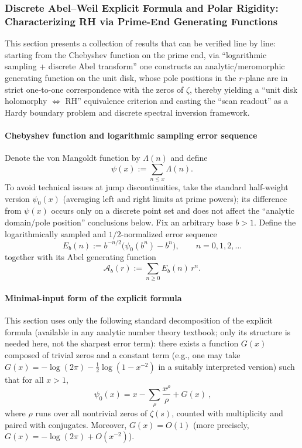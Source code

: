 \subsubsection{Discrete Abel--Weil Explicit Formula and Polar Rigidity: Characterizing RH via Prime-End Generating Functions}\label{subsec:discrete-abel-weil-polar-rigidity}
This section presents a collection of results that can be verified line by line: starting from the Chebyshev function on the prime end, via ``logarithmic sampling + discrete Abel transform'' one constructs an analytic/meromorphic generating function on the unit disk, whose pole positions in the \(r\)-plane are in strict one-to-one correspondence with the zeros of \(\zeta\), thereby yielding a ``unit disk holomorphy \(\Leftrightarrow\) RH'' equivalence criterion and casting the ``scan readout'' as a Hardy boundary problem and discrete spectral inversion framework.

\paragraph{Chebyshev function and logarithmic sampling error sequence}
Denote the von Mangoldt function by \(\Lambda(n)\) and define
\[
\psi(x):=\sum_{n\le x}\Lambda(n).
\]
To avoid technical issues at jump discontinuities, take the standard half-weight version \(\psi_0(x)\) (averaging left and right limits at prime powers); its difference from \(\psi(x)\) occurs only on a discrete point set and does not affect the ``analytic domain/pole position'' conclusions below.
Fix an arbitrary base \(b>1\). Define the logarithmically sampled and \(1/2\)-normalized error sequence
\[
\boxed{\ E_b(n):=b^{-n/2}\bigl(\psi_0(b^n)-b^n\bigr),\qquad n=0,1,2,\dots\ }
\]
together with its Abel generating function
\[
\boxed{\ \mathcal A_b(r):=\sum_{n\ge 0}E_b(n)\,r^n.\ }
\]

\paragraph{Minimal-input form of the explicit formula}
This section uses only the following standard decomposition of the explicit formula (available in any analytic number theory textbook; only its structure is needed here, not the sharpest error term):
there exists a function \(G(x)\) composed of trivial zeros and a constant term (e.g., one may take \(G(x)=-\log(2\pi)-\tfrac12\log(1-x^{-2})\) in a suitably interpreted version) such that for all \(x>1\),
\begin{equation}\label{eq:psi0-explicit-schematic}
\boxed{\ \psi_0(x)=x-\sum_{\rho}\frac{x^\rho}{\rho}+G(x)\ },
\end{equation}
where \(\rho\) runs over all nontrivial zeros of \(\zeta(s)\), counted with multiplicity and paired with conjugates. Moreover, \(G(x)=O(1)\) (more precisely, \(G(x)=-\log(2\pi)+O(x^{-2})\)).

